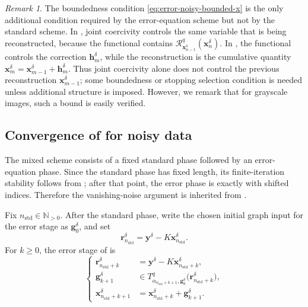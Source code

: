 \documentclass{article}
\theoremstyle{remark}
\newtheorem{remark}[theorem]{Remark}
\newcommand{\Rreg}{\mathcal{R}}
\newcommand{\bx}{{\bm{x}}}
\newcommand{\by}{{\bm{y}}}
\newcommand{\bh}{{\bm{h}}}
\newcommand{\br}{{\bm{r}}}
\newcommand{\bg}{{\bm{g}}}
\begin{document}
\begin{remark}
The boundedness condition \cref{eq:error-noisy-bounded-x} is the only additional condition required by the error-equation scheme but not by the standard scheme. In
, joint coercivity controls the same variable that is
being reconstructed, because the functional contains
\(\Rreg_{\bx_{n-1}^\delta}^q(\bx_n^\delta)\). In
, the functional controls the correction
\(\bh_m^\delta\), while the reconstruction is the cumulative quantity
\(\bx_m^\delta=\bx_{m-1}^\delta+\bh_m^\delta\). Thus joint coercivity alone does
not control the previous reconstruction \(\bx_{m-1}^\delta\); some boundedness or stopping
selection condition is needed unless additional structure is imposed. However, we remark that for grayscale images, such a bound is easily verified.
\end{remark}

\subsection{Convergence of \texorpdfstring{}{the mixed scheme} for noisy data}
\label{sec:mixed-convergence}

The mixed scheme consists of a fixed standard phase followed by an error-equation
phase. Since the standard phase has fixed length, its finite-iteration stability
follows from ; after that point, the error phase is
exactly  with shifted indices. Therefore the vanishing-noise
argument is inherited from .

Fix \(n_{\mathrm{std}}\in\mathbb N_{>0}\). After the standard phase, write the
chosen initial graph input for the error stage as \(\bg_0^\delta\), and set
\[
\br_{n_{\mathrm{std}}}^\delta
=
\by^\delta-K\bx_{n_{\mathrm{std}}}^\delta .
\]
For \(k\ge0\), the error stage of  is
\begin{equation}\label{eq:mixed-error-stage}
\left\{
\begin{aligned}
\br_{n_{\mathrm{std}}+k}^\delta
&=
\by^\delta-K\bx_{n_{\mathrm{std}}+k}^\delta,\\
\bg_{k+1}^\delta
&\in
T_{\alpha_{n_{\mathrm{std}}+k+1},\bg_k^\delta}^q
\bigl(\br_{n_{\mathrm{std}}+k}^\delta\bigr),\\
\bx_{n_{\mathrm{std}}+k+1}^\delta
&=
\bx_{n_{\mathrm{std}}+k}^\delta+\bg_{k+1}^\delta .
\end{aligned}
\right.
\end{equation}
\end{document}

